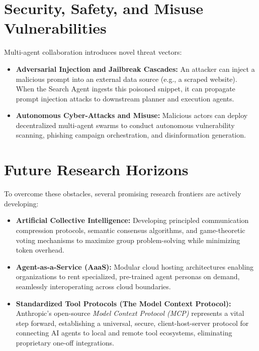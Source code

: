 \documentclass[12pt,a4paper]{report}
\begin{document}
\section{Security, Safety, and Misuse Vulnerabilities}
Multi-agent collaboration introduces novel threat vectors:
\begin{itemize}
    \item \textbf{Adversarial Injection and Jailbreak Cascades:} An attacker can inject a malicious prompt into an external data source (e.g., a scraped website). When the Search Agent ingests this poisoned snippet, it can propagate prompt injection attacks to downstream planner and execution agents.
    \item \textbf{Autonomous Cyber-Attacks and Misuse:} Malicious actors can deploy decentralized multi-agent swarms to conduct autonomous vulnerability scanning, phishing campaign orchestration, and disinformation generation.
\end{itemize}

\section{Future Research Horizons}
To overcome these obstacles, several promising research frontiers are actively developing:
\begin{itemize}
    \item \textbf{Artificial Collective Intelligence:} Developing principled communication compression protocols, semantic consensus algorithms, and game-theoretic voting mechanisms to maximize group problem-solving while minimizing token overhead.
    \item \textbf{Agent-as-a-Service (AaaS):} Modular cloud hosting architectures enabling organizations to rent specialized, pre-trained agent personas on demand, seamlessly interoperating across cloud boundaries.
    \item \textbf{Standardized Tool Protocols (The Model Context Protocol):} Anthropic's open-source \textit{Model Context Protocol (MCP)} \cite{anthropic2024mcp} represents a vital step forward, establishing a universal, secure, client-host-server protocol for connecting AI agents to local and remote tool ecosystems, eliminating proprietary one-off integrations.
\end{itemize}


\end{document}
